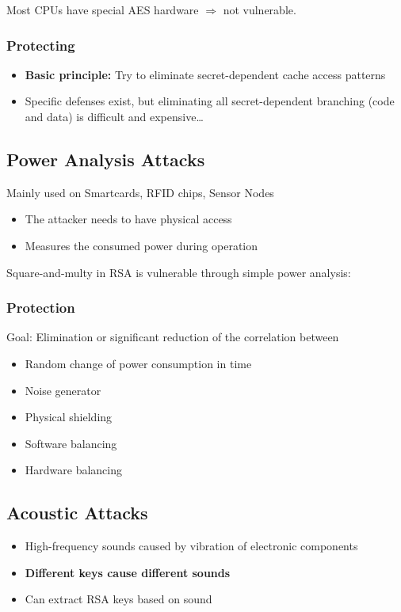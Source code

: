 Most CPUs have special AES hardware  $\Rightarrow$ not vulnerable.
\subsubsection{Protecting}
\begin{itemize}
  \item \textbf{Basic principle:}
    Try to eliminate secret-dependent cache access patterns
  \item Specific defenses exist, but eliminating all secret-dependent
    branching (code and data) is difficult and expensive…
\end{itemize}

\subsection{Power Analysis Attacks}
Mainly used on Smartcards, RFID chips, Sensor Nodes
\begin{itemize}
  \item The attacker needs to have physical access
  \item Measures the consumed power during  operation
\end{itemize}
Square-and-multy in RSA is vulnerable through simple power analysis:
\subsubsection{Protection}
Goal: Elimination or significant reduction of the correlation between
\begin{itemize}
	\item Random change of power consumption in time
	\item Noise generator
	\item Physical shielding
	\item Software balancing
	\item Hardware balancing
\end{itemize}

\subsection{Acoustic Attacks}
\begin{itemize}
	\item High-frequency sounds caused by vibration of
electronic components
\item \textbf{Different keys cause different sounds}
  \item Can extract RSA keys based on sound
\end{itemize}
